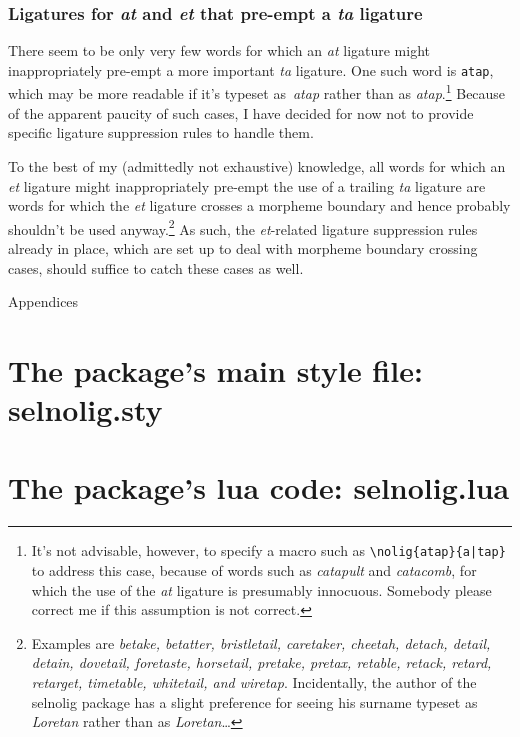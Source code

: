 \documentclass[12pt]{article}
\newcommand{\pkg}[1]{\textsf{#1}}
\newcommand{\opt}[1]{\texttt{#1}}
\let\oldappendix\appendix
\renewcommand\appendix{%
   \clearpage
   \addtocontents{toc}{\protect{\vspace{0.75\baselineskip}}}
   \addtocontents{toc}{\protect{\mdseries Appendices\par}}
   \noindent
   {\Large Appendices}
   \oldappendix}
\begin{document}
\subsubsection{Ligatures for \emph{at} and \emph{et} that pre-empt a \emph{ta} ligature}

There seem to be only very few words for which an \emph{at} ligature might inappropriately pre-empt a more important \emph{ta} ligature. One such word is \opt{atap}, which may be more readable if it's typeset as~\emph{a\mbox{ta}p} rather than as \emph{atap}.\footnote{It's not advisable, however, to specify a macro such as \Verb+\nolig{atap}{a|tap}+ to address this case, because of words such as \emph{catapult} and \emph{catacomb}, for which the use of the \emph{at} ligature is presumably innocuous. Somebody please correct me if this assumption is not correct.}  Because of the apparent paucity of such cases, I have decided for now not to provide specific ligature suppression rules to handle them.

To the best of my (admittedly not exhaustive) knowledge, all words for which an \emph{et} ligature might inappropriately pre-empt the use of a trailing \emph{ta} ligature are words for which the \emph{et} ligature crosses a morpheme boundary and hence probably shouldn't be used anyway.\footnote{Examples are {\em betake, betatter, bristletail, caretaker, cheetah, detach, detail, detain, dovetail, foretaste, horsetail, pretake, pretax, retable, retack, retard, retarget, timetable, whitetail, \emph{and} wiretap}. Incidentally, the author of the \pkg{selnolig} package has a slight preference for seeing his surname typeset as \emph{Loretan} rather than as \emph{Loretan}\ldots} As such, the \emph{et}-related ligature suppression rules already in place, which are set up to deal with morpheme boundary crossing cases, should suffice to catch these cases as well.



\appendix
{}

\small

\section[The package's main style file: selnolig.sty]
{The package's main style file: \pkg{selnolig.sty}}


\clearpage
\section[The package's lua code: selnolig.lua]{The package's lua code: \pkg{selnolig.lua}}
\label{sec:luacode}
\end{document}

